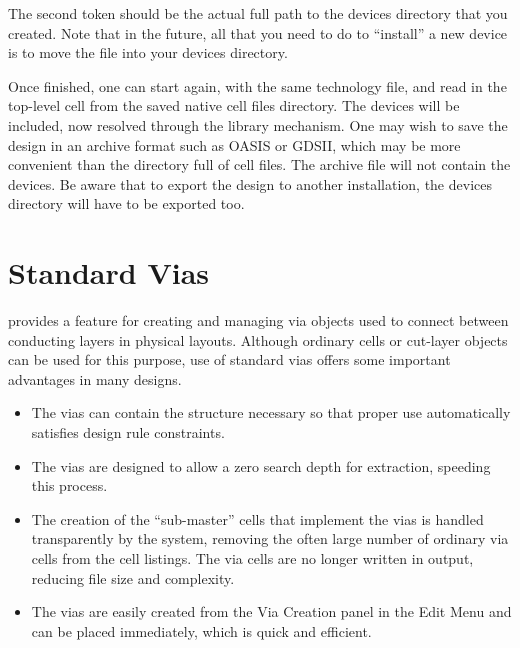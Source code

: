 The second token should be the actual full path to the {\vt devices}
directory that you created.  Note that in the future, all that you
need to do to ``install'' a new device is to move the file into your
{\vt devices} directory.

Once finished, one can start {\Xic} again, with the same technology
file, and read in the top-level cell from the saved native cell files
directory.  The devices will be included, now resolved through the
library mechanism.  One may wish to save the design in an archive
format such as OASIS or GDSII, which may be more convenient than the
directory full of cell files.  The archive file will not contain the
devices.  Be aware that to export the design to another {\Xic}
installation, the {\vt devices} directory will have to be exported
too.


\section{Standard Vias}
\label{stdvia}

{\Xic} provides a feature for creating and managing via objects used
to connect between conducting layers in physical layouts.  Although
ordinary cells or cut-layer objects can be used for this purpose, use
of standard vias offers some important advantages in many designs.

\begin{itemize}
\item{The vias can contain the structure necessary so that proper use
automatically satisfies design rule constraints.}

\item{The vias are designed to allow a zero search depth for
extraction, speeding this process.}

\item{The creation of the ``sub-master'' cells that implement the vias
is handled transparently by the system, removing the often large
number of ordinary via cells from the cell listings.  The via cells
are no longer written in output, reducing file size and complexity.}

\item{The vias are easily created from the {\cb Via Creation} panel in
the {\cb Edit Menu} and can be placed immediately, which is quick and
efficient.}
\end{itemize}

